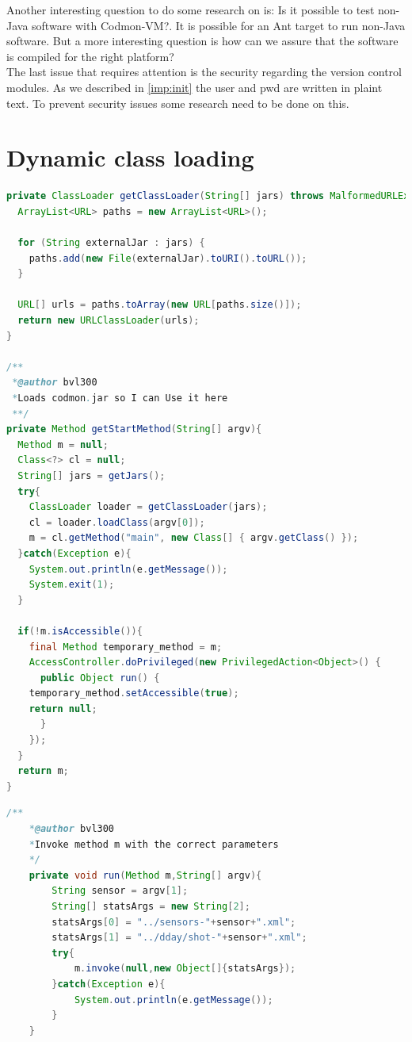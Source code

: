 \documentclass{article}
\newcommand{\project}{Codmon-VM}
\begin{document}
\noindent Another interesting question to do some research on is: Is it possible to test non-Java software with \project{}?. It is possible for an Ant target to run non-Java software. But a more interesting 
question is how can we assure that the software is compiled for the right platform?\\

\noindent The last issue that requires attention is the security regarding the version control modules. As we described in \ref{imp:init} the user and pwd are written in plaint text. To prevent security issues some 
research need to be done on this.

\newpage

\newpage
\appendix
\section{Dynamic class loading}
\label{AppendixA}

\begin{lstlisting}[frame=single ,language=Java]
private ClassLoader getClassLoader(String[] jars) throws MalformedURLException, SecurityException{
  ArrayList<URL> paths = new ArrayList<URL>();

  for (String externalJar : jars) {
    paths.add(new File(externalJar).toURI().toURL());
  }
  
  URL[] urls = paths.toArray(new URL[paths.size()]);
  return new URLClassLoader(urls);
}	

/**
 *@author bvl300
 *Loads codmon.jar so I can Use it here
 **/
private Method getStartMethod(String[] argv){	
  Method m = null;
  Class<?> cl = null;
  String[] jars = getJars();
  try{
    ClassLoader loader = getClassLoader(jars);
    cl = loader.loadClass(argv[0]);
    m = cl.getMethod("main", new Class[] { argv.getClass() });
  }catch(Exception e){
    System.out.println(e.getMessage());
    System.exit(1);
  }

  if(!m.isAccessible()){
    final Method temporary_method = m;
    AccessController.doPrivileged(new PrivilegedAction<Object>() {
      public Object run() {
	temporary_method.setAccessible(true);
	return null;
      }
    });
  }
  return m;
} 
\end{lstlisting} 
\newpage
{}
\begin{lstlisting}[frame=single ,language=Java]
	/**
 	*@author bvl300
 	*Invoke method m with the correct parameters
 	*/ 
	private void run(Method m,String[] argv){
		String sensor = argv[1];
		String[] statsArgs = new String[2];
		statsArgs[0] = "../sensors-"+sensor+".xml";
		statsArgs[1] = "../dday/shot-"+sensor+".xml";
		try{
			m.invoke(null,new Object[]{statsArgs});
		}catch(Exception e){
			System.out.println(e.getMessage());
		}
	}
\end{lstlisting}  
\end{document}
